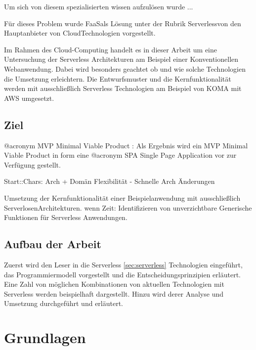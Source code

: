 \documentclass[
12pt,
english,
ngerman,
headsepline,
twoside,
openright,
numbers=noenddot,version=first
]{scrreprt}
\begin{document}
Um sich von diesem spezialisierten wissen aufzulösen wurde ...

Für dieses Problem wurde \glqq FaaS\grqq als Lösung unter der Rubrik \glqq Serverless\grqq von den Hauptanbieter von \glqq Cloud\grqq Technologien vorgestellt.

Im Rahmen des Cloud-Computing handelt es in dieser Arbeit um eine Untersuchung der Serverless Architekturen am Beispiel einer Konventionellen Webanwendung. Dabei wird besonders geachtet ob und wie solche Technologien die Umsetzung erleichtern. Die Entwurfsmuster und die Kernfunktionalität werden mit ausschließlich Serverless Technologien am Beispiel von KOMA mit AWS umgesetzt.


\section{Ziel}
\label{sec:task}


@acronym MVP Minimal Viable Product : \cite{rady2016serverless}
Als Ergebnis wird ein MVP Minimal Viable Product in form eine @acronym SPA Single Page Application vor zur Verfügung gestellt.

Start::Chars: Arch + Domän Flexibilität - Schnelle Arch Änderungen

Umsetzung der Kernfunktionalität einer Beispielanwendung mit ausschließlich \glqq Serverlosen\grqq Architekturen.
wenn Zeit: Identifizieren von unverzichtbare Generische Funktionen für Serverless Anwendungen.


\section{Aufbau der Arbeit}
\label{sec:layout}

Zuerst wird den Leser in die Serverless \ref{sec:serverless} Technologien eingeführt, das Programmiermodell vorgestellt
und die Entscheidungsprinzipien erläutert.
Eine Zahl von möglichen Kombinationen von aktuellen Technologien mit Serverless werden beispielhaft dargestellt.
Hinzu wird derer Analyse und Umsetzung durchgeführt und erläutert.

\chapter{Grundlagen}
\label{chap:principles}
\end{document}
